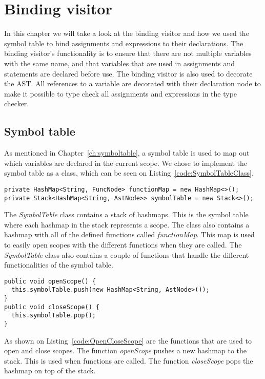 \chapter{Binding visitor}\label{ch:bindingvisitor}
In this chapter we will take a look at the binding visitor and how we used the symbol table to bind assignments and expressions to their declarations.
The binding visitor's functionality is to ensure that there are not multiple variables with the same name, and that variables that are used in assignments and statements are declared before use. The binding visitor is also used to decorate the AST. All references to a variable are decorated with their declaration node to make it possible to type check all assignments and expressions in the type checker.

\section{Symbol table}
As mentioned in Chapter~\ref{ch:symboltable}, a symbol table is used to map out which variables are declared in the current scope. We chose to implement the symbol table as a class, which can be seen on Listing~\ref{code:SymbolTableClass}.
\begin{lstlisting}[caption={Symbol table class},label={code:SymbolTableClass}]
private HashMap<String, FuncNode> functionMap = new HashMap<>();
private Stack<HashMap<String, AstNode>> symbolTable = new Stack<>();
\end{lstlisting}
The \textit{SymbolTable} class contains a stack of hashmaps. 
This is the symbol table where each hashmap in the stack represents a scope. 
The class also contains a hashmap with all of the defined functions called \textit{functionMap}. 
This map is used to easily open scopes with the different functions when they are called.
The \textit{SymbolTable} class also contains a couple of functions that handle the different functionalities of the symbol table. 
\begin{lstlisting}[caption={Code to open and close scopes},label={code:OpenCloseScope}]
public void openScope() {
  this.symbolTable.push(new HashMap<String, AstNode>());
}
public void closeScope() {
  this.symbolTable.pop();
}
\end{lstlisting}
As shown on Listing~\ref{code:OpenCloseScope} are the functions that are used to open and close scopes. The function \textit{openScope} pushes a new hashmap to the stack. This is used when functions are called. The function \textit{closeScope} pops the hashmap on top of the stack. 


